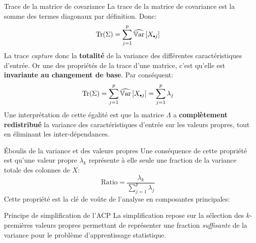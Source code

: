 \begin{frame}{Trace de la matrice de covariance}
	La trace de la matrice de covariance est la somme des termes diagonaux par définition. Donc:
	\begin{equation}
		\operatorname{Tr}(\Sigma) = \displaystyle \sum_{j=1}^p \Varhat{X_{\bigdot j}}
		\nonumber
	\end{equation}
	\pause
	La trace \textit{capture} donc la \textbf{totalité} de la variance des différentes caractéristiques d'entrée. Or une des propriétés de la trace d'une matrice, c'est qu'elle est \textbf{invariante au changement de base}. Par conséquent:
	\begin{equation}
		\operatorname{Tr}(\Sigma) = \displaystyle \sum_{j=1}^p \Varhat{X_{\bigdot j}} = \sum_{j=1}^p \lambda_j
		\nonumber
	\end{equation}
	Une interprétation de cette égalité est que la matrice $\Lambda$ a \textbf{complètement redistribué} la variance des caractéristiques d'entrée sur les valeurs propres, tout en éliminant les inter-dépendances.
\end{frame}

\begin{frame}{\'Eboulis de la variance et des valeurs propres}
	Une conséquence de cette propriété est qu'une valeur propre $\lambda_k$ représente à elle seule une fraction de la variance totale des colonnes de $X$:
	\begin{equation}
		\text{Ratio} = \frac{\lambda_k}{\sum_{j=1}^p \lambda_j}
		\nonumber 
	\end{equation}
	\pause
	Cette propriété est la clé de voûte de l'analyse en composantes principales:
	\begin{block}{Principe de simplification de l'ACP}
		La simplification repose sur la sélection des $k$-premières valeurs propres permettant de représenter une fraction \textit{suffisante} de la variance pour le problème d'apprentissage statistique.
	\end{block}
\end{frame}

